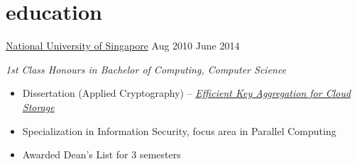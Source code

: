 \documentclass[]{cv} %
\begin{document}
\section{education}
\entry
{\href{http://www.nus.edu.sg/}{National University of Singapore}}
{Aug 2010 \to June 2014}
{\emph{1st Class Honours in Bachelor of Computing, Computer Science}
\begin{itemize}
\item Dissertation (Applied Cryptography) -- \href{https://github.com/clouddra/FYP---Key-Aggregation/blob/master/paper/paper.pdf}{\emph{Efficient Key Aggregation for Cloud Storage}}
\item Specialization in Information Security, focus area in Parallel Computing
\item Awarded Dean's List for 3 semesters
\end{itemize}
}

\end{document}
